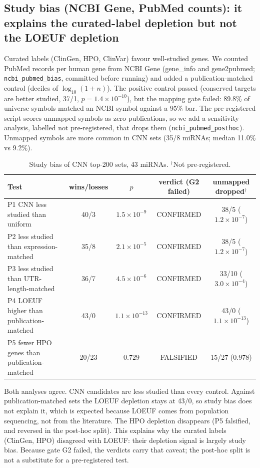 \subsection{Study bias (NCBI Gene, PubMed counts): it explains the curated-label depletion but not the LOEUF depletion}
Curated labels (ClinGen, HPO, ClinVar) favour well-studied genes. We counted PubMed records per human gene from NCBI Gene (gene\_info and gene2pubmed; \texttt{ncbi\_pubmed\_bias}, committed before running) and added a publication-matched control (deciles of $\log_{10}(1+n)$). The positive control passed (conserved targets are better studied, 37/1, $p=1.4\times10^{-10}$), but the mapping gate failed: 89.8\% of universe symbols matched an NCBI symbol against a 95\% bar. The pre-registered script scores unmapped symbols as zero publications, so we add a sensitivity analysis, labelled not pre-registered, that drops them (\texttt{ncbi\_pubmed\_posthoc}). Unmapped symbols are more common in CNN sets (35/8 miRNAs; median 11.0\% vs 9.2\%).
\begin{table}[h]\centering\footnotesize\begin{tabular}{lcccc}\hline Test & wins/losses & $p$ & verdict (G2 failed) & unmapped dropped$^\dagger$\\\hline
P1 CNN less studied than uniform & 40/3 & $1.5\times10^{-9}$ & CONFIRMED & 38/5 ($1.2\times10^{-7}$) \\
P2 less studied than expression-matched & 35/8 & $2.1\times10^{-5}$ & CONFIRMED & 38/5 ($1.2\times10^{-7}$) \\
P3 less studied than UTR-length-matched & 36/7 & $4.5\times10^{-6}$ & CONFIRMED & 33/10 ($3.0\times10^{-4}$) \\
P4 LOEUF higher than publication-matched & 43/0 & $1.1\times10^{-13}$ & CONFIRMED & 43/0 ($1.1\times10^{-13}$) \\
P5 fewer HPO genes than publication-matched & 20/23 & $0.729$ & FALSIFIED & 15/27 ($0.978$) \\
\hline\end{tabular}\caption{Study bias of CNN top-200 sets, 43 miRNAs. $^\dagger$Not pre-registered.}\label{tab:pubmed}\end{table}
Both analyses agree. CNN candidates are less studied than every control. Against publication-matched sets the LOEUF depletion stays at 43/0, so study bias does not explain it, which is expected because LOEUF comes from population sequencing, not from the literature. The HPO depletion disappears (P5 falsified, and reversed in the post-hoc split). This explains why the curated labels (ClinGen, HPO) disagreed with LOEUF: their depletion signal is largely study bias. Because gate G2 failed, the verdicts carry that caveat; the post-hoc split is not a substitute for a pre-registered test.

